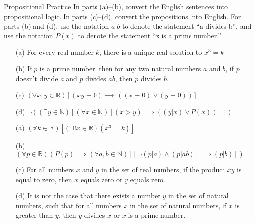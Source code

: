 \begin{homeworkProblem}{Propositional Practice}
    In parts (a)–(b), convert the English sentences into propositional 
    logic. In parts (c)–(d), convert the propositions into English. For 
    parts (b) and (d), use the notation $a | b$ to denote the statement ``a 
    divides b”, and use the notation $P(x)$ to denote the statement ``x is a 
    prime number.”

    \begin{itemize}
        \item[(a)] For every real number $k$, there is a unique real 
        solution to $x^3 = k$
        \item[(b)] If $p$ is a prime number, then for any two natural numbers $a$ and $b$, if $p$ doesn’t divide $a$ and $p$ divides $ab$, then $p$ divides $b$.
        \item[(c)] $(\forall x, y \in \mathbb{R})[(xy = 0) \implies ((x = 0) \vee (y = 0))] $
        \item[(d)] $\neg ((\exists y \in \mathbb{N})[(\forall x \in \mathbb{N})[(x > y) \implies (( y | x) \vee P(x))]])$
    \end{itemize}

    \solution
    
    \begin{itemize}
        \item[(a)] $(\forall k \in \mathbb{R})[(\exists !x \in \mathbb{R})
        (x^3 = k)]$
        \item[(b)] $(\forall p \in \mathbb{R})(P(p) \implies (\forall a, b \in \mathbb{N})[[\neg(p | a) 
        \wedge (p | ab)] \implies (p|b)])$
        \item[(c)] For all numbers $x$ and $y$ in the set of real numbers, 
        if the product $xy$ is equal to zero, then $x$ equals zero or $y$ 
        equals zero.
        \item[(d)] It is not the case that there exists a number $y$ in the 
        set of natural numbers, such that for all numbers $x$ in the set of 
        natural numbers, if $x$ is greater than $y$, then $y$ divides $x$ 
        or $x$ is a prime number. 
    \end{itemize}
    
\end{homeworkProblem}